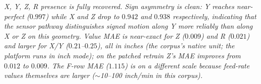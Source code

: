 \begin{table}[ht]
{\begin{tabular}{l r r r r r}
\bottomrule
\end{tabular}%
}
\par\smallskip
\footnotesize\textit{X, Y, Z, R presence is fully recovered. Sign asymmetry is clean: Y reaches near-perfect ($0.997$) while X and Z drop to $0.942$ and $0.938$ respectively, indicating that the sensor pathway distinguishes signed motion along Y more reliably than along X or Z on this geometry. Value MAE is near-exact for Z ($0.009$) and R ($0.021$) and larger for X/Y ($0.21$--$0.25$), all in \emph{inches} (the corpus's native unit; the platform runs in inch mode); on the patched retrain Z's MAE improves from $0.012$ to $0.009$. The F-row MAE ($1.115$) is on a different scale because feed-rate values themselves are larger ($\sim$10--100 inch/min in this corpus).}
\end{table}
